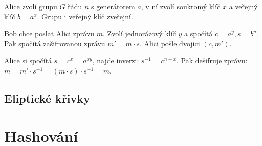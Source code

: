 \documentclass[10pt,a4paper]{article}
\begin{document}
Alice zvolí grupu $G$ řádu $n$ s generátorem $a$, v ní zvolí soukromý klíč $x$ a
veřejný klíč $b=a^x$. Grupu i veřejný klíč zveřejní.

Bob chce poslat Alici zprávu $m$. Zvolí jednorázový klíč $y$ a spočítá $c=a^y,
s=b^y$. Pak spočítá zašifrovanou zprávu $m' = m \cdot s$. Alici pošle dvojici
$(c, m')$.

Alice si spočítá $s = c^x = a^{xy}$, najde inverzi: $s^{-1} = c^{n-x}$. Pak
dešifruje zprávu: $m = m' \cdot s^{-1} = (m\cdot s) \cdot s^{-1} = m$.


\subsection{Eliptické křivky}

\section{Hashování}
\end{document}
